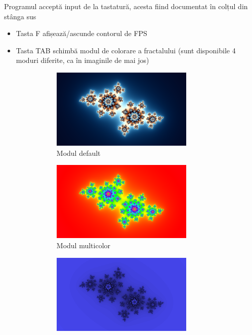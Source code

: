 \documentclass[12pt]{report}
\begin{document}
Programul acceptă input de la tastatură, acesta fiind documentat în colțul din stânga sus
\begin{itemize}
	\item Tasta F afișează/ascunde contorul de FPS
	\item Tasta TAB schimbă modul de colorare a fractalului (sunt disponibile 4 moduri diferite, ca în imaginile de mai jos)
	      \begin{figure}[h]
		      \centering
		      \begin{subfigure}{.5\textwidth}
			      \centering
			      \includegraphics[width=0.8\textwidth]{Images/color1.png}
			      \caption{Modul default}
		      \end{subfigure}%
		      \begin{subfigure}{.5\textwidth}
			      \centering
			      \includegraphics[width=0.8\textwidth]{Images/color2.png}
			      \caption{Modul multicolor}
		      \end{subfigure}
		      \begin{subfigure}{.5\textwidth}
			      \centering
			      \includegraphics[width=0.8\textwidth]{Images/color3.png}

\end{subfigure}
\end{figure}
\end{itemize}
\end{document}
